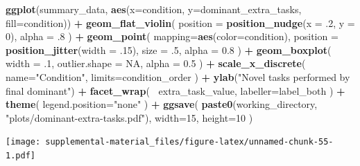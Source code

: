 \documentclass[]{book}
\newenvironment{Shaded}{\begin{snugshade}}{\end{snugshade}}
\newcommand{\DataTypeTok}[1]{\textcolor[rgb]{0.13,0.29,0.53}{#1}}
\newcommand{\DecValTok}[1]{\textcolor[rgb]{0.00,0.00,0.81}{#1}}
\newcommand{\FloatTok}[1]{\textcolor[rgb]{0.00,0.00,0.81}{#1}}
\newcommand{\KeywordTok}[1]{\textcolor[rgb]{0.13,0.29,0.53}{\textbf{#1}}}
\newcommand{\NormalTok}[1]{#1}
\newcommand{\OperatorTok}[1]{\textcolor[rgb]{0.81,0.36,0.00}{\textbf{#1}}}
\newcommand{\OtherTok}[1]{\textcolor[rgb]{0.56,0.35,0.01}{#1}}
\newcommand{\StringTok}[1]{\textcolor[rgb]{0.31,0.60,0.02}{#1}}
\begin{document}
\begin{Shaded}
\begin{Highlighting}[]
\KeywordTok{ggplot}\NormalTok{(summary_data, }\KeywordTok{aes}\NormalTok{(}\DataTypeTok{x=}\NormalTok{condition, }\DataTypeTok{y=}\NormalTok{dominant_extra_tasks, }\DataTypeTok{fill=}\NormalTok{condition)) }\OperatorTok{+}
\StringTok{  }\KeywordTok{geom_flat_violin}\NormalTok{(}
    \DataTypeTok{position =} \KeywordTok{position_nudge}\NormalTok{(}\DataTypeTok{x =} \FloatTok{.2}\NormalTok{, }\DataTypeTok{y =} \DecValTok{0}\NormalTok{),}
    \DataTypeTok{alpha =} \FloatTok{.8}
\NormalTok{  ) }\OperatorTok{+}
\StringTok{  }\KeywordTok{geom_point}\NormalTok{(}
    \DataTypeTok{mapping=}\KeywordTok{aes}\NormalTok{(}\DataTypeTok{color=}\NormalTok{condition),}
    \DataTypeTok{position =} \KeywordTok{position_jitter}\NormalTok{(}\DataTypeTok{width =} \FloatTok{.15}\NormalTok{),}
    \DataTypeTok{size =} \FloatTok{.5}\NormalTok{,}
    \DataTypeTok{alpha =} \FloatTok{0.8}
\NormalTok{  ) }\OperatorTok{+}
\StringTok{  }\KeywordTok{geom_boxplot}\NormalTok{(}
    \DataTypeTok{width =} \FloatTok{.1}\NormalTok{,}
    \DataTypeTok{outlier.shape =} \OtherTok{NA}\NormalTok{,}
    \DataTypeTok{alpha =} \FloatTok{0.5}
\NormalTok{  ) }\OperatorTok{+}
\StringTok{  }\KeywordTok{scale_x_discrete}\NormalTok{(}
    \DataTypeTok{name=}\StringTok{"Condition"}\NormalTok{,}
    \DataTypeTok{limits=}\NormalTok{condition_order}
\NormalTok{  ) }\OperatorTok{+}
\StringTok{  }\KeywordTok{ylab}\NormalTok{(}\StringTok{"Novel tasks performed by final dominant"}\NormalTok{) }\OperatorTok{+}
\StringTok{  }\KeywordTok{facet_wrap}\NormalTok{(}
    \OperatorTok{~}\NormalTok{extra_task_value,}
    \DataTypeTok{labeller=}\NormalTok{label_both}
\NormalTok{  ) }\OperatorTok{+}
\StringTok{  }\KeywordTok{theme}\NormalTok{(}
    \DataTypeTok{legend.position=}\StringTok{"none"}
\NormalTok{  ) }\OperatorTok{+}
\StringTok{  }\KeywordTok{ggsave}\NormalTok{(}
    \KeywordTok{paste0}\NormalTok{(working_directory, }\StringTok{"plots/dominant-extra-tasks.pdf"}\NormalTok{),}
    \DataTypeTok{width=}\DecValTok{15}\NormalTok{,}
    \DataTypeTok{height=}\DecValTok{10}
\NormalTok{  )}
\end{Highlighting}
\end{Shaded}

\texttt{[image: supplemental-material\_files/figure-latex/unnamed-chunk-55-1.pdf]}

\begin{Shaded}
\end{Shaded}
\end{document}
